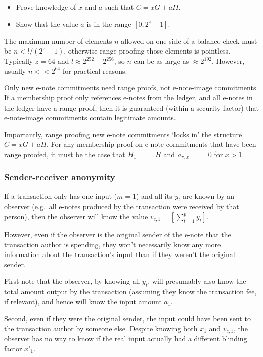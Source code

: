 \begin{itemize}
    \item Prove knowledge of $x$ and $a$ such that $C = x G + a H$.

    \item Show that the value $a$ is in the range $[0, 2^{z} - 1]$.
\end{itemize}

The maximum number of elements $n$ allowed on one side of a balance check must be $n < l / (2^z - 1)$, otherwise range proofing those elements is pointless. Typically $z = 64$ and $l \approx 2^{252} - 2^{256}$, so $n$ can be as large as $\approx 2^{192}$. However, usually $n << 2^{64}$ for practical reasons.

Only new e-note commitments need range proofs, not e-note-image commitments. If a membership proof only references e-notes from the ledger, and all e-notes in the ledger have a range proof, then it is guaranteed (within a security factor) that e-note-image commitments contain legitimate amounts.

Importantly, range proofing new e-note commitments `locks in' the structure $C = x G + a H$. For any membership proof on e-note commitments that have been range proofed, it must be the case that $H_1 == H$ and $a_{\pi,x} == 0$ for $x > 1$.

\subsubsection{Sender-receiver anonymity}
\label{subsubsec:confidential-transactions-sender-receiver-anonymity}

If a transaction only has one input ($m = 1$) and all its $y_t$ are known by an observer (e.g.\ all e-notes produced by the transaction were received by that person), then the observer will know the value $v_{c,1} = [\sum^{p}_{t=1} y_t]$.

However, even if the observer is the original sender of the e-note that the transaction author is spending, they won't necessarily know any more information about the transaction's input than if they weren't the original sender.

First note that the observer, by knowing all $y_t$, will presumably also know the total amount output by the transaction (assuming they know the transaction fee, if relevant), and hence will know the input amount $a_1$.

Second, even if they were the original sender, the input could have been sent to the transaction author by someone else. Despite knowing both $x_1$ and $v_{c,1}$, the observer has no way to know if the real input actually had a different blinding factor $x'_1$.

